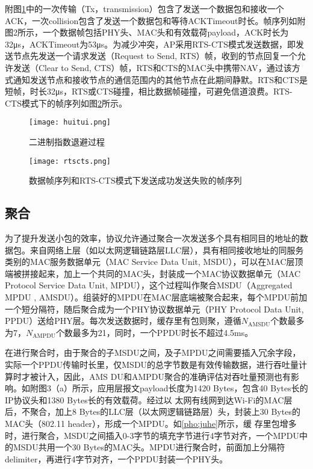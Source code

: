 \documentclass[bwprint]{gmcmthesis}
\begin{document}
附图\ref{pho:huitui}中的一次传输（Tx，transmission）包含了发送一个数据包和接收一个ACK，一次collision包含了发送一个数据包和等待ACKTimeout时长。帧序列如附图2所示，一个数据帧包括PHY头、MAC头和有效载荷payload，ACK时长为32μs，ACKTimeout为53μs。为减少冲突，AP采用RTS-CTS模式发送数据，即发送节点先发送一个请求发送（Request to Send, RTS）帧，收到的节点回复一个允许发送（Clear to Send, CTS）帧，RTS和CTS的MAC头中携带NAV，通过该方式通知发送节点和接收节点的通信范围内的其他节点在此期间静默。RTS和CTS是短帧，时长32μs，RTS或CTS碰撞，相比数据帧碰撞，可避免信道浪费。RTS-CTS模式下的帧序列如图\ref{pho:rtscts}所示。
\begin{figure}[!htbp]
    \centering
    \texttt{[image: huitui.png]}
    \caption{\centering 二进制指数退避过程}
    \label{pho:huitui}
\end{figure}
\begin{figure}[!htbp]
    \centering
    \texttt{[image: rtscts.png]}
    \caption{\centering 数据帧序列和RTS-CTS模式下发送成功发送失败的帧序列}
    \label{pho:rtscts}
\end{figure}

\subsection{聚合}
为了提升发送小包的效率，协议允许通过聚合一次发送多个具有相同目的地址的数据包。来自网络上层（如以太网逻辑链路层LLC层），具有相同接收地址的同服务类别的MAC服务数据单元（MAC Service Data Unit, MSDU），可以在MAC层顶端被拼接起来，加上一个共同的MAC头，封装成一个MAC协议数据单元（MAC Protocol Service Data Unit, MPDU），这个过程叫作聚合MSDU（Aggregated MPDU , AMSDU）。组装好的MPDU在MAC层底端被聚合起来，每个MPDU前加一个短分隔符，随后聚合成为一个PHY协议数据单元（PHY Protocol Data Unit, PPDU）送给PHY层。每次发送数据时，缓存里有包则聚，遵循$N_{\text{AMSDU}}$个数最多为7，$N_{\text{AMPDU}}$个数最多为21，同时，一个PPDU时长不超过4.5ms。

在进行聚合时，由于聚合的子MSDU之间，及子MPDU之间需要插入冗余字段，实际一个PPDU传输时长里，仅MSDU的总字节数是有效传输数据，进行吞吐量计算时才被计入，因此，AMS
DU和AMPDU聚合的准确评估对吞吐量预测也有影响。如附图3（a）所示，应用层报文payload长度为1420 Bytes，包含40 Bytes长的IP协议头和1380 Bytes长的有效载荷。经过以
太网有线网到达Wi-Fi的MAC层后，不聚合，加上8 Bytes的LLC层（以太网逻辑链路层）头，封装上30 Bytes的MAC头（802.11 header），形成一个MPDU。如\ref{pho:juhe}所示，缓
存里包增多时，进行聚合，MSDU之间插入0-3字节的填充字节进行4字节对齐，一个MPDU中的MSDU共用一个30 Bytes的MAC头。MPDU进行聚合时，前面加上分隔符delimiter，再进行4字节对齐，一个PPDU封装一个PHY头。
\end{document}
